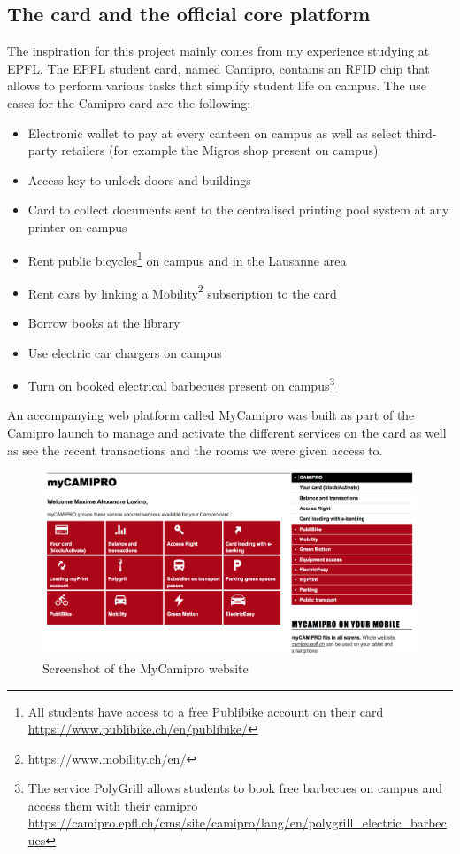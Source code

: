 \documentclass[11pt,a4paper]{report}
\begin{document}
\subsection{The card and the official core platform}
The inspiration for this project mainly comes from my experience studying at EPFL. The EPFL student card, named Camipro\cite{camipro:homepage}, contains an RFID chip that allows to perform various tasks that simplify student life on campus. The use cases for the Camipro card are the following:
\begin{itemize}
    \item Electronic wallet to pay at every canteen on campus as well as select third-party retailers (for example the Migros shop present on campus)
    \item Access key to unlock doors and buildings
    \item Card to collect documents sent to the centralised printing pool system at any printer on campus
    \item Rent public bicycles\footnote{All students have access to a free Publibike account on their card \url{https://www.publibike.ch/en/publibike/}} on campus and in the Lausanne area
    \item Rent cars by linking a Mobility\footnote{\url{https://www.mobility.ch/en/}} subscription to the card
    \item Borrow books at the library
    \item Use electric car chargers on campus
    \item Turn on booked electrical barbecues present on campus\footnote{The service PolyGrill allows students to book free barbecues on campus and access them with their camipro \url{https://camipro.epfl.ch/cms/site/camipro/lang/en/polygrill_electric_barbecues}}
\end{itemize}

An accompanying web platform called MyCamipro was built as part of the Camipro launch to manage and activate the different services on the card as well as see the recent transactions and the rooms we were given access to.

\begin{figure}[H]
\begin{center}
	\includegraphics[width=.6\textwidth]{assets/camipro_website.png}
	\caption{Screenshot of the MyCamipro website}
\end{center}
\end{figure}
\end{document}
